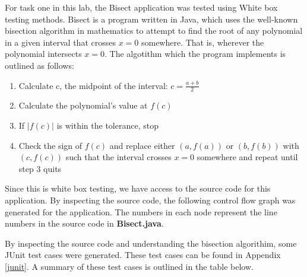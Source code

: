 For task one in this lab, the Bisect application was tested using White box
testing methods. Bisect is a program written in Java, which
uses the well-known bisection algorithm in mathematics to attempt to find the
root of any polynomial in a given interval that crosses $x=0$ somewhere. That
is, wherever the polynomial intersects $x=0$.
The algotithm which the program implements is outlined as follows:

\begin{enumerate}
	\item Calculate c, the midpoint of the interval: $ c = \frac{a+b}{2} $
	\item Calculate the polynomial's value at $f(c)$
	\item If $|f(c)|$ is within the tolerance, stop
	\item Check the sign of $f(c)$ and replace either $(a, f(a))$ or $(b, f(b))$
	      with $(c, f(c))$ such that the interval crosses $x=0$ somewhere and repeat
	      until step 3 quits
\end{enumerate}

Since this is white box testing, we have access to the source code for this
application. By inspecting the source code, the following control flow graph was
generated for the application. The numbers in each node represent the line
numbers in the source code in \textbf{Bisect.java}.

\begin{adjustbox}{center, height=\textheight}
\end{adjustbox}

By inspecting the source code and understanding the bisection algorithim,
some JUnit test cases were generated. These test cases can be found in Appendix
\ref{junit}. A summary of these test cases is outlined in the table below.
\vspace{1cm}

